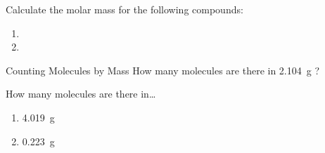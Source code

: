 \documentclass[notes=onlyslideswithnotes,notes=hide]{beamer}
\begin{document}
\clearpage

\begin{onyourown}
	Calculate the molar mass for the following compounds:

	\begin{enumerate}
		\item {}
			
			\vspace{10em}

		\item {}
	\end{enumerate}
\end{onyourown}
	
\begin{frame}[t]{Counting Molecules by Mass}
	How many molecules are there in \SI{2.104}{\gram} ?


%
\end{frame}

\begin{onyourown}
	How many molecules are there in\ldots
	\begin{enumerate}
		\item \SI{4.019}{\gram}~

			\vspace*{10em}
			\clearpage

		\item \SI{0.223}{\gram}~
	\end{enumerate}
\end{onyourown}
\end{document}
